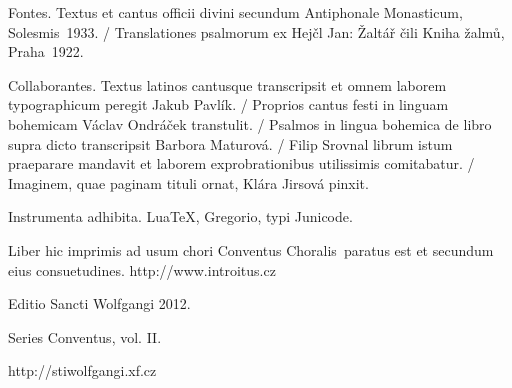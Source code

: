 \documentclass[a4paper, twoside, 12pt]{article}
\begin{document}

\vfill

\pagebreak

\label{oratioetc}

\anteOrationem

\pagebreak

\oratioDiei

\translatioOrationis

\benedicamusDomino

\inFineHorarum

\pagebreak

\pagestyle{empty}

Fontes. 
Textus et cantus officii divini secundum 
Antiphonale Monasticum, Solesmis~1933. /
Translationes psalmorum ex
Hejčl Jan: Žaltář čili Kniha žalmů, Praha~1922.

Collaborantes.
Textus latinos cantusque transcripsit et omnem laborem typographicum peregit
Jakub Pavlík. /
Proprios cantus festi in linguam bohemicam Václav Ondráček transtulit. /
Psalmos in lingua bohemica de libro supra dicto transcripsit
Barbora Maturová. /
Filip Srovnal librum istum praeparare mandavit et laborem exprobrationibus
utilissimis comitabatur. /
Imaginem, quae paginam tituli ornat, Klára Jirsová pinxit.

Instrumenta adhibita.
LuaTeX, %
Gregorio, %
typi Junicode. %

\begin{center}
Liber hic imprimis ad usum chori 
\guillemotright Conventus Choralis\guillemotleft\ 
paratus est
et secundum eius consuetudines.
http://www.introitus.cz

\vspace{1cm}

{\large Editio Sancti Wolfgangi 2012.}

\vspace{2mm}

Series \guillemotright Conventus\guillemotleft, vol. II.

\vspace{1cm}

http://stiwolfgangi.xf.cz

\end{center}

\vfill
\end{document}
